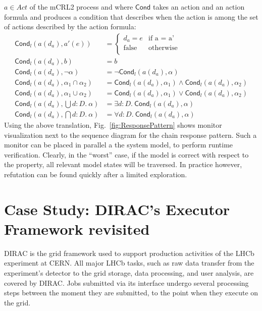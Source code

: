 \documentclass[letter]{llncs}
\newcommand{\TrA}{\ensuremath{\mathsf{Cond}}}
\begin{document}
$a \in Act$ of the mCRL2 process and
where $\TrA$ takes an action and an action formula and produces a condition
that describes when the action is among the set of actions described by
the action formula:
\vspace{-7 pt}
\[
\begin{array}{ll}
\TrA_l(a(d_a),a'(e)) & = \left \{ \begin{array}{ll} d_a = e & \text{if a = a'}\\
                                  \text{false} & \text{otherwise}\\
                                  \end{array} \right .\\
\TrA_l(a(d_a),b) & = b \\
\TrA_l(a(d_a),\neg \alpha) & = \neg \TrA_l(a(d_a),\alpha) \\
\TrA_l(a(d_a),\alpha_1 \cap \alpha_2) & =
\TrA_l(a(d_a),\alpha_1) \wedge \TrA_l(a(d_a),\alpha_2) \\
\TrA_l(a(d_a),\alpha_1 \cup \alpha_2) & =
\TrA_l(a(d_a),\alpha_1) \vee \TrA_l(a(d_a),\alpha_2) \\
\TrA_l(a(d_a),\bigcup d{:}D.~\alpha) & = \exists d{:}D.~ \TrA_l(a(d_a),\alpha)\\
\TrA_l(a(d_a),\bigcap d{:}D.~\alpha) & = \forall d{:}D.~ \TrA_l(a(d_a),\alpha)
\end{array}
\]
Using the above translation, Fig.~\ref{fig:ResponsePattern} shows monitor visualization next to the sequence diagram for the chain response pattern.
Such a monitor can be placed in parallel a the system model,
to perform runtime verification. Clearly, in the ``worst'' case, if the model is correct with respect to the property,
all relevant model states will be traversed. In practice however, refutation can be found 
quickly after a limited exploration. 
\vspace{-7 pt}

\section{Case Study: DIRAC's Executor Framework revisited}
\vspace{-8 pt}

DIRAC \cite{DIRAC_CommGridSolution} is the grid framework used to support production activities of the LHCb experiment at CERN.
All major LHCb tasks, such as raw data transfer from the experiment's detector to the grid storage, data processing, and user analysis,
are covered by DIRAC. 
Jobs submitted via its interface undergo several processing steps between the moment they are submitted, 
to the point when they execute on the grid. 
\end{document}

